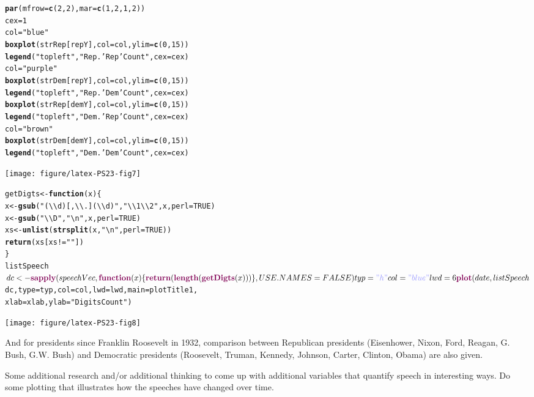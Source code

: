 \documentclass{article}\usepackage{graphicx, color}
\makeatletter
\newcommand{\hlfunctioncall}[1]{\textcolor[rgb]{0.501960784313725,0,0.329411764705882}{\textbf{#1}}}%
\newcommand{\hlstring}[1]{\textcolor[rgb]{0.6,0.6,1}{#1}}%
\newenvironment{kframe}{%
 \def\at@end@of@kframe{}%
 \ifinner\ifhmode%
  \def\at@end@of@kframe{\end{minipage}}%
  \begin{minipage}{\columnwidth}%
 \fi\fi%
 \def\FrameCommand##1{\hskip\@totalleftmargin \hskip-\fboxsep
 \colorbox{shadecolor}{##1}\hskip-\fboxsep
     \hskip-\linewidth \hskip-\@totalleftmargin \hskip\columnwidth}%
 \MakeFramed {\advance\hsize-\width
   \@totalleftmargin\z@ \linewidth\hsize
   \@setminipage}}%
 {\par\unskip\endMakeFramed%
 \at@end@of@kframe}
\newenvironment{knitrout}{}{} %
\makeatother
\begin{document}
\begin{knitrout}
\begin{kframe}
\begin{alltt}
\hlfunctioncall{par}(mfrow = \hlfunctioncall{c}(2, 2), mar = \hlfunctioncall{c}(1, 2, 1, 2))
cex = 1
col = \hlstring{"blue"}
\hlfunctioncall{boxplot}(strRep[repY], col = col, ylim = \hlfunctioncall{c}(0, 15))
\hlfunctioncall{legend}(\hlstring{"topleft"}, \hlstring{"Rep. \hlstring{'Rep'} Count"}, cex = cex)
col = \hlstring{"purple"}
\hlfunctioncall{boxplot}(strDem[repY], col = col, ylim = \hlfunctioncall{c}(0, 15))
\hlfunctioncall{legend}(\hlstring{"topleft"}, \hlstring{"Rep. \hlstring{'Dem'} Count"}, cex = cex)
\hlfunctioncall{boxplot}(strRep[demY], col = col, ylim = \hlfunctioncall{c}(0, 15))
\hlfunctioncall{legend}(\hlstring{"topleft"}, \hlstring{"Dem. \hlstring{'Rep'} Count"}, cex = cex)
col = \hlstring{"brown"}
\hlfunctioncall{boxplot}(strDem[demY], col = col, ylim = \hlfunctioncall{c}(0, 15))
\hlfunctioncall{legend}(\hlstring{"topleft"}, \hlstring{"Dem. \hlstring{'Dem'} Count"}, cex = cex)
\end{alltt}
\end{kframe}\texttt{[image: figure/latex-PS23-fig7]} \begin{kframe}\begin{alltt}

getDigts <- \hlfunctioncall{function}(x) \{
    x <- \hlfunctioncall{gsub}(\hlstring{"(\textbackslash{}\textbackslash{}d)[,\textbackslash{}\textbackslash{}.](\textbackslash{}\textbackslash{}d)"}, \hlstring{"\textbackslash{}\textbackslash{}1\textbackslash{}\textbackslash{}2"}, x, perl = TRUE)
    x <- \hlfunctioncall{gsub}(\hlstring{"\textbackslash{}\textbackslash{}D"}, \hlstring{"\textbackslash{}n"}, x, perl = TRUE)
    xs <- \hlfunctioncall{unlist}(\hlfunctioncall{strsplit}(x, \hlstring{"\textbackslash{}n"}, perl = TRUE))
    \hlfunctioncall{return}(xs[xs != \hlstring{""}])
\}
listSpeech$dc <- \hlfunctioncall{sapply}(speechVec, \hlfunctioncall{function}(x) \{
    \hlfunctioncall{return}(\hlfunctioncall{length}(\hlfunctioncall{getDigts}(x)))
\}, USE.NAMES = FALSE)
typ = \hlstring{"h"}
col = \hlstring{"blue"}
lwd = 6
\hlfunctioncall{plot}(date, listSpeech$dc, type = typ, col = col, lwd = lwd, main = plotTitle1, 
    xlab = xlab, ylab = \hlstring{"Digits Count"})
\end{alltt}
\end{kframe}\texttt{[image: figure/latex-PS23-fig8]} 
\end{knitrout}







And for presidents since Franklin Roosevelt in 1932, comparison between Republican presidents 
(Eisenhower, Nixon, Ford, Reagan, G. Bush, G.W. Bush) and Democratic presidents 
(Roosevelt, Truman, Kennedy, Johnson, Carter, Clinton, Obama) are also given.









Some additional research and/or additional thinking to come up with additional
variables that quantify speech in interesting ways. Do some plotting that illustrates how the
speeches have changed over time.
\end{document}
